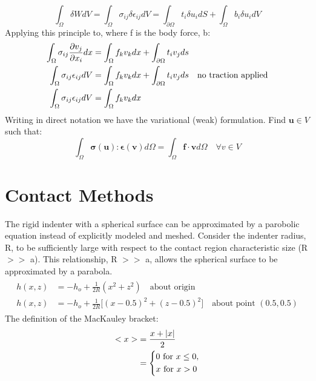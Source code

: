 \documentclass[12pt,3p]{article}
\numberwithin{equation}{section}
\begin{document}
\begin{equation}\label{PVW}
\int_{\Omega} \delta W dV = \int_{\Omega} \sigma_{ij} \delta \epsilon_{ij} dV = \int_{\partial \Omega} t_i \delta u_i dS + \int_{\Omega} b_i \delta u_i dV 
\end{equation}
Applying this principle to, where f is  the body force, b: 
\begin{align*}
 \int_{\Omega} \sigma_{ij} \pdv{v_j}{x_i} dx &= \int_{\Omega} f_k v_k dx + \int_{\partial \Omega} t_i v_j ds \\
 \int_{\Omega} \sigma_{ij} \epsilon_{ij} dV &= \int_{\Omega} f_k v_k dx + \int_{\partial \Omega} t_i v_j ds \quad \text{no traction applied} \\
  \int_{\Omega} \sigma_{ij} \epsilon_{ij} dV &= \int_{\Omega} f_k v_k dx
\end{align*}
Writing in direct notation we have the variational (weak) formulation. Find $\mathbf{u} \in V$ such that: 
\begin{equation}\label{weakForm}
\int_{\Omega} \mathbf{ \sigma(u) : \epsilon(v) } d \Omega = \int_{\Omega} \mathbf{ f \cdot v } d \Omega \quad \forall v \in V 
\end{equation}

\section{Contact Methods}
The rigid indenter with a spherical surface can be approximated by a parobolic equation instead of explicitly modeled and meshed. Consider the indenter radius, R, to be sufficiently large with respect to the contact region characteristic size (R $>>$ a). This relationship, R $>>$ a, allows the spherical surface to be approximated by a parabola.
\begin{align}\label{Indenter}
\begin{split}
h(x,z) &= - h_o + \frac{1}{2 R}(x^2 + z^2) \quad \text{about origin} \\
h(x, z) &= - h_o + \frac{1}{2 R}\big[ (x - 0.5)^2 + (z-0.5)^2 \big] \quad \text{about point } (0.5, 0.5)
\end{split}
\end{align}
The definition of the MacKauley bracket:
\begin{align}\label{MacKauley}
\begin{split}
<x> &= \frac{x + |x|}{2} \\
&= 
\begin{dcases}
    0 \text{ for } x \leq 0, \\
    x \text{ for } x > 0
\end{dcases}
\end{split}
\end{align}
\end{document}
